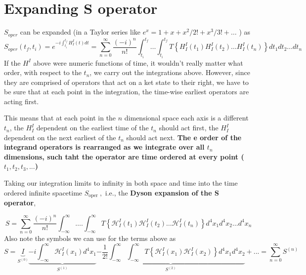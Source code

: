\section{Expanding S operator}
$S_{oper}$ can be expanded (in a Taylor series like $e^{x}=1+x+x^{2} / 2 !+x^{3} / 3 !+\ldots$ ) as
$$
S_{o p e r}\left(t_{f}, t_{i}\right)=e^{-i \int_{t_{i}}^{t_{f}} H_{I}^{I}(t) d t}=\sum_{n=0}^{\infty} \frac{(-i)^{n}}{n !} \int_{t_{i}}^{t_{f}} \dots \int_{t_{i}}^{t_{f}} T\left\{H_{I}^{I}\left(t_{1}\right) H_{I}^{I}\left(t_{2}\right) \dots H_{I}^{I}\left(t_{n}\right)\right\} d t_{1} d t_{2} \dots d t_{n}
$$
If the $H^{I}$ above were numeric functions of time, it wouldn't really matter what order, with respect to the $t_{n}$, we carry out the integrations above. However, since they are comprised of operators that act on a ket state to their right, we have to be sure that at each point in the integration, the time-wise earliest operators are acting first.

This means that at each point in the $n$ dimensional space each axis is a different $t_{n}$, the $H_{I}^{I}$ dependent on the earliest time of the $t_{n}$ should act first, the $H_{I}^{I}$ dependent on the next earliest of the $t_{n}$ should act next. \textbf{The e order of the integrand operators is rearranged as we integrate over all $t_n$ dimensions, such taht the operator are time ordered at every point ($t_1,t_2,t_3,...$)}

Taking our integration limits to infinity in both space and time into the time ordered infinite spacetime $S_{\text {oper }},$ i.e., the \textbf{Dyson expansion of the S operator},
\begin{qt}
\begin{equation}
S=\sum_{n=0}^{\infty} \frac{(-i)^{n}}{n !} \int_{-\infty}^{\infty} \ldots . \int_{-\infty}^{\infty} T\left\{\mathcal{H}_{I}^{I}\left(t_{1}\right) \mathcal{H}_{I}^{I}\left(t_{2}\right) \ldots \mathcal{H}_{I}^{I}\left(t_{n}\right)\right\} d^{4} x_{1} d^{4} x_{2} \ldots d^{4} x_{n}
\end{equation}
Also note the symbols we can use for the terms above as
$$
S=\underbrace{I}_{S^{(0)}}\underbrace{-i \int_{-\infty}^{\infty} \mathcal{H}_{I}^{I}\left(x_{1}\right) d^{4} x_{1}}_{S^{(1)}}\underbrace{-\frac{1}{2!} \int_{-\infty}^{\infty} \int_{-\infty}^{\infty} T\left\{\mathcal{H}_{I}^{I}\left(x_{1}\right) \mathcal{H}_{I}^{I}\left(x_{2}\right)\right\} d^{4} x_{1} d^{4} x_{2}}_{S^{(2)}}+...=\sum_{n=0}^{\infty} S^{(n)}
$$
\end{qt}

